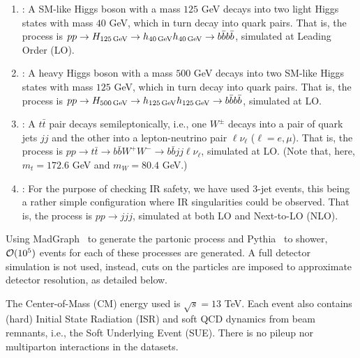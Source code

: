     \begin{enumerate}
        \item 
    : A SM-like Higgs boson with a mass \(125\) GeV decays into two light Higgs states with mass  \(40\) GeV,
    which in turn decay into \beau{}\bbar{} quark pairs.
    That is, the process is \(p p \rightarrow H_{125\,\text{GeV}} \rightarrow h_{40\,\text{GeV}} h_{40\,\text{GeV}} \rightarrow b \bar{b} b \bar{b}\), simulated at Leading Order (LO).

\item {}:  A heavy Higgs boson with a mass \(500\) GeV decays into two SM-like Higgs states with mass  \(125\) GeV,
    which in turn decay into \beau{}\bbar{} quark pairs.
    That is, the process is \(p p \rightarrow H_{500\,\text{GeV}} \rightarrow h_{125\,\text{GeV}} h_{125\,\text{GeV}} \rightarrow b \bar{b} b \bar{b}\), simulated at LO.

\item {}:  A $t\bar t$ pair decays semileptonically, i.e.,  one \(W^\pm\) decays into a pair of quark jets $jj$ and the other into a lepton-neutrino pair $\ell\nu_\ell$ ($\ell=e,\mu$).
        That is, the process is \( p p \rightarrow t \bar{t} \rightarrow b\bar b W^+  W^-\to b\bar b jj \ell\nu_\ell\), simulated at LO. (Note that, here, $m_t=172.6$ GeV and $m_{W}=80.4$ GeV.)
        
    \item {}:  For the purpose of checking {IR safety}, we have used 3-jet events,         this being a rather simple configuration where IR singularities could be observed. 
        That is, the process is $pp\to jjj$, simulated at both LO and Next-to-LO (NLO). 



    \end{enumerate}

    Using MadGraph~\cite{Alwall:2011uj} to generate the partonic process and Pythia~\cite{Sjostrand:2014zea} to shower, ${\cal O}(10^5)$ events for each of these processes are generated.
    A full detector simulation is not used, instead, cuts on the particles are imposed to approximate detector resolution, as detailed below. 
    
    The Center-of-Mass (CM) energy used is \(\sqrt{s}=13 \) TeV.
%
    Each event also contains (hard) Initial State Radiation (ISR) and soft QCD dynamics from beam remnants, i.e., the Soft Underlying Event (SUE).
    There is no pileup nor multiparton interactions in the datasets.

